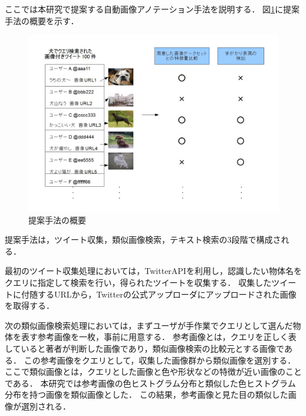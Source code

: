 \documentclass{deimj}
\begin{document}
ここでは本研究で提案する自動画像アノテーション手法を説明する．
図\ref{fig:way}に提案手法の概要を示す．
%
\begin{figure}[tb]
 \begin{center}
  \includegraphics[scale=0.29]{way.jpg}
 \end{center}
 \caption{提案手法の概要}
 \label{fig:way}
\end{figure}
%
提案手法は，ツイート収集，類似画像検索，テキスト検索の3段階で構成される．



最初のツイート収集処理においては，TwitterAPIを利用し，認識したい物体名をクエリに指定して検索を行い，得られたツイートを収集する．
収集したツイートに付随するURLから，Twitterの公式アップローダにアップロードされた画像を取得する．

次の類似画像検索処理においては，まずユーザが手作業でクエリとして選んだ物体を表す参考画像を一枚，事前に用意する．
参考画像とは，クエリを正しく表していると著者が判断した画像であり，類似画像検索の比較元とする画像である．
この参考画像をクエリとして，収集した画像群から類似画像を選別する．
ここで類似画像とは，クエリとした画像と色や形状などの特徴が近い画像のことである．
本研究では参考画像の色ヒストグラム分布と類似した色ヒストグラム分布を持つ画像を類似画像とした．
この結果，参考画像と見た目の類似した画像が選別される．
\end{document}
